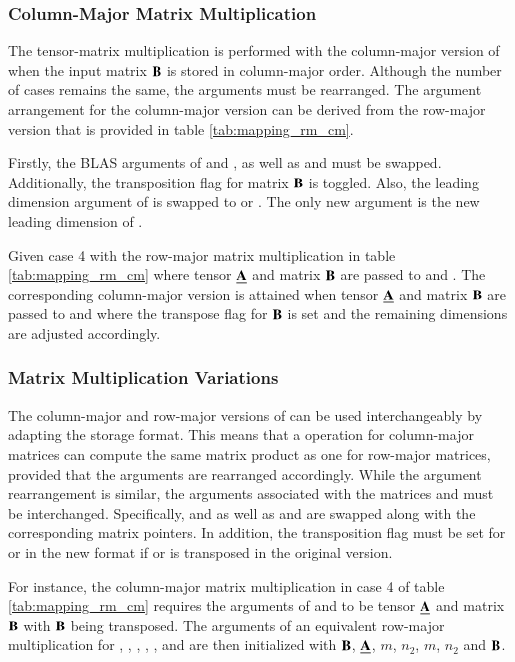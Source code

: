 \subsubsection{Column-Major Matrix Multiplication}
The tensor-matrix multiplication is performed with the column-major version of  when the input matrix $\mathbf{B}$ is stored in column-major order.
Although the number of  cases remains the same, the  arguments must be rearranged.
The argument arrangement for the column-major version can be derived from the row-major version that is provided in table \ref{tab:mapping_rm_cm}.

Firstly, the BLAS arguments of  and , as well as  and  must be swapped.
Additionally, the transposition flag for matrix $\mathbf{B}$ is toggled.
Also, the leading dimension argument of  is swapped to  or .
The only new argument is the new leading dimension of .

Given case 4 with the row-major matrix multiplication in table \ref{tab:mapping_rm_cm} where tensor $\underline{\mathbf{A}}$ and matrix $\mathbf{B}$ are passed to  and .
The corresponding column-major version is attained when tensor $\underline{\mathbf{A}}$ and matrix $\mathbf{B}$ are passed to  and  where the transpose flag for $\mathbf{B}$ is set and the remaining dimensions are adjusted accordingly.


\subsubsection{Matrix Multiplication Variations}
The column-major and row-major versions of  can be used interchangeably by adapting the storage format. 
This means that a  operation for column-major matrices can compute the same matrix product as one for row-major matrices, provided that the arguments are rearranged accordingly.
While the argument rearrangement is similar, the arguments associated with the matrices  and  must be interchanged.
Specifically,  and  as well as  and  are swapped along with the corresponding matrix pointers.
In addition, the transposition flag must be set for  or  in the new format if  or  is transposed in the original version.

For instance, the column-major matrix multiplication in case 4 of table \ref{tab:mapping_rm_cm} requires the arguments of  and  to be tensor $\underline{\mathbf{A}}$ and matrix $\mathbf{B}$ with $\mathbf{B}$ being transposed.
The arguments of an equivalent row-major multiplication for , , , , ,  and  are then initialized with $\mathbf{B}$, $\underline{\mathbf{A}}$, $m$, $n_2$, $m$, $n_2$ and $\mathbf{B}$.

